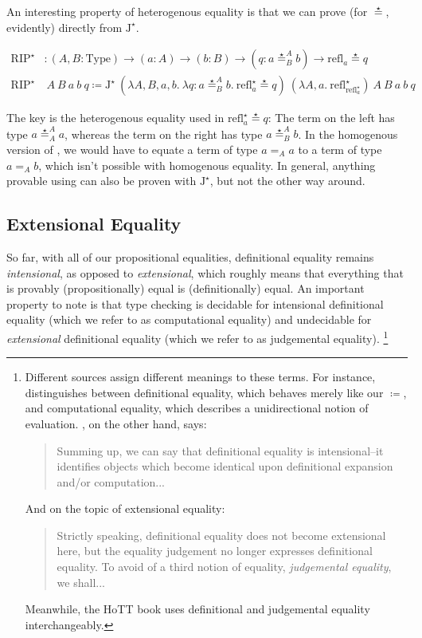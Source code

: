\documentclass{report}
\newcommand{\const}[1]{\text{#1}}
\newcommand{\Type}{\const{Type}}
\newcommand{\refl}{\const{refl}}
\newcommand{\jelim}{\const{J}\xspace}
\newcommand{\rip}{\const{RIP}\xspace}
\begin{document}
An interesting property of heterogenous equality is that we can prove \rip (for $\stareq$, evidently) directly from $\jelim^\star$.

\begin{align*}
    \rip^\star &: (A, B : \Type) \to (a : A) \to (b : B) \to (q : a \stareq^A_B b) \to \refl_a \stareq q \\
    \rip^\star &~ A ~ B ~ a ~ b ~ q \coloneqq \jelim^\star ~ (\lambda A, B, a, b. ~ \lambda q : a \stareq^A_B b. ~ \refl^\star_a \stareq q) ~ (\lambda A, a. ~ \refl^\star_{\refl^\star_a}) ~ A ~ B ~ a ~ b ~ q
\end{align*}

The key is the heterogenous equality used in $\refl^\star_a \stareq q$: The term on the left has type $a \stareq^A_A a$, whereas the term on the right has type $a \stareq^A_B b$. In the homogenous version of \jelim, we would have to equate a term of type $a =_A a$ to a term of type $a =_A b$, which isn't possible with homogenous equality. In general, anything provable using \jelim can also be proven with $\jelim^\star$, but not the other way around.

\subsection{Extensional Equality}

So far, with all of our propositional equalities, definitional equality remains \emph{intensional}, as opposed to \emph{extensional}, which roughly means that everything that is provably (propositionally) equal is (definitionally) equal. An important property to note is that type checking is decidable for intensional definitional equality (which we refer to as computational equality) and undecidable for \emph{extensional} definitional equality (which we refer to as judgemental equality).%
\footnote{Different sources assign different meanings to these terms. For instance, \citet{nlab-equality} distinguishes between definitional equality, which behaves merely like our $\coloneqq$, and computational equality, which describes a unidirectional notion of evaluation. \citet{ext-concepts}, on the other hand, says:
\begin{quote}
    Summing up, we can say that definitional equality is intensional--it identifies objects which become identical upon definitional expansion and/or computation...
\end{quote}
And on the topic of extensional equality:
\begin{quote}
    Strictly speaking, definitional equality does not become extensional here, but the equality judgement no longer expresses definitional equality. To avoid of a third notion of equality, \emph{judgemental equality}, we shall...
\end{quote}
Meanwhile, the HoTT book \citep{hott-book} uses definitional and judgemental equality interchangeably.}
\end{document}

